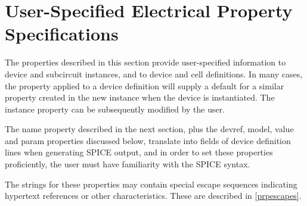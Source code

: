 \section{User-Specified Electrical Property Specifications}
\label{elecpropuser}

The properties described in this section provide user-specified
information to device and subcircuit instances, and to device and cell
definitions.  In many cases, the property applied to a device
definition will supply a default for a similar property created in the
new instance when the device is instantiated.  The instance property
can be subsequently modified by the user. 

The {\et name} property described in the next section, plus the {\et
devref}, {\et model}, {\et value} and {\et param} properties discussed
below, translate into fields of device definition lines when
generating SPICE output, and in order to set these properties
proficiently, the user must have familiarity with the SPICE syntax.

The strings for these properties may contain special escape sequences
indicating hypertext references or other characteristics.  These are
described in \ref{prpescapes}.

